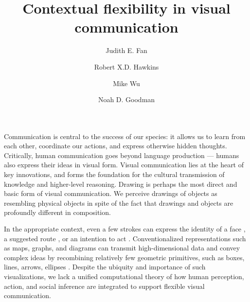 \documentclass[9pt,twocolumn,twoside]{pnas-new}
\title{Contextual flexibility in visual communication}
\author[a,1,*]{Judith E. Fan}
\author[a,*]{Robert X.D. Hawkins}
\author[b]{Mike Wu}
\author[a,b]{Noah D. Goodman}
\affil[a]{Department of Psychology, Stanford University}
\affil[b]{Department of Computer Science, Stanford University}
\affil[*]{These authors contributed equally to this work.}
\begin{document}


\verticaladjustment{-2pt}

\maketitle
\thispagestyle{firststyle}

Communication is central to the success of our species: it allows us to learn from each other, coordinate our actions, and express otherwise hidden thoughts. Critically, human communication goes beyond language production --- humans also express their ideas in visual form. Visual communication lies at the heart of key innovations, and forms the foundation for the cultural transmission of knowledge and higher-level reasoning. Drawing is perhaps the most direct and basic form of visual communication. We perceive drawings of objects as resembling physical objects in spite of the fact that drawings and objects are profoundly different in composition.

In the appropriate context, even a few strokes can express the identity of a face \cite[]{bergmann2013impact}, a suggested route \cite[]{agrawala2001rendering}, or an intention to act \cite[]{Galantucci:2005uh}. Conventionalized representations such as maps, graphs, and diagrams can transmit high-dimensional data and convey complex ideas by recombining relatively few geometric primitives, such as boxes, lines, arrows, ellipses \cite[]{tversky2000lines}. Despite the ubiquity and importance of such visualizations, we lack a unified computational theory of how human perception, action, and social inference are integrated to support flexible visual communication.
\end{document}
